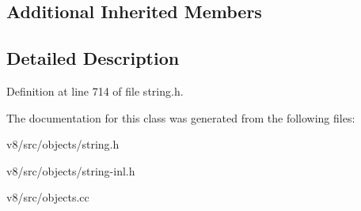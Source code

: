 \subsection*{Additional Inherited Members}


\subsection{Detailed Description}


Definition at line 714 of file string.\+h.



The documentation for this class was generated from the following files\+:\begin{DoxyCompactItemize}
\item 
v8/src/objects/string.\+h\item 
v8/src/objects/string-\/inl.\+h\item 
v8/src/objects.\+cc\end{DoxyCompactItemize}
